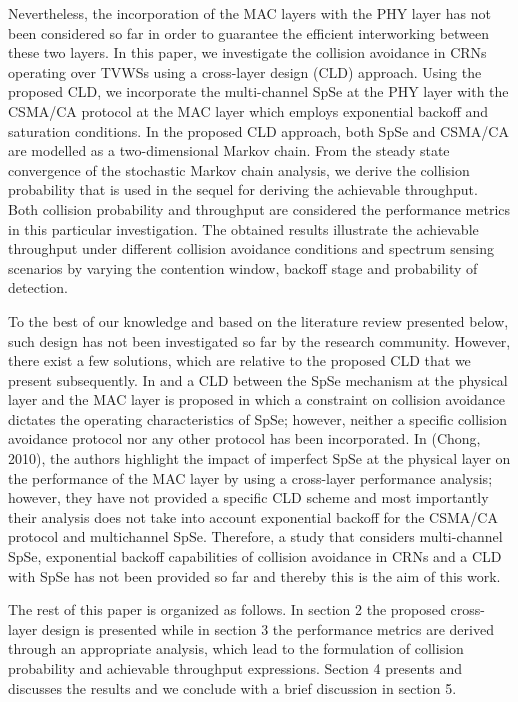 \documentclass
[journal,11pt,draftclsnofoot,onecolumn,doublespace]{tETN2e}
\begin{document}
Nevertheless, the incorporation of the MAC layers with the PHY layer has not been considered so far in order to guarantee the efficient interworking between these two layers. In this paper, we investigate the collision avoidance in CRNs operating over TVWSs using a cross-layer design (CLD) approach. Using the proposed CLD, we incorporate the multi-channel SpSe at the PHY layer with the CSMA/CA protocol at the MAC layer which employs exponential backoff and saturation conditions. In the proposed CLD approach, both SpSe and CSMA/CA are modelled as a two-dimensional Markov chain. From the steady state convergence of the stochastic Markov chain analysis, we derive the collision probability that is used in the sequel for deriving the achievable throughput. Both collision probability and throughput are considered the performance metrics in this particular investigation. The obtained results illustrate the achievable throughput under different collision avoidance conditions and spectrum sensing scenarios by varying the contention window, backoff stage and probability of detection.  

To the best of our knowledge and based on the literature review presented below, such design has not been investigated so far by the research community. However, there exist a few solutions, which are relative to the proposed CLD that we present subsequently. In \citep{chen08} and \citep{liang08} a CLD between the SpSe mechanism at the physical layer and the MAC layer is proposed in which a constraint on collision avoidance dictates the operating characteristics of SpSe; however, neither a specific collision avoidance protocol nor any other protocol has been incorporated. In (Chong, 2010), the authors highlight the impact of imperfect SpSe at the physical layer on the performance of the MAC layer by using a cross-layer performance analysis; however, they have not provided a specific CLD scheme and most importantly their analysis does not take into account exponential backoff for the CSMA/CA protocol and multichannel SpSe. Therefore, a study that considers multi-channel SpSe, exponential backoff capabilities of collision avoidance in CRNs and a CLD with SpSe has not been provided so far and thereby this is the aim of this work. 

The rest of this paper is organized as follows. In section 2 the proposed cross-layer design is presented while in section 3 the performance metrics are derived through an appropriate analysis, which lead to the formulation of collision probability and achievable throughput expressions. Section 4 presents and discusses the results and we conclude with a brief discussion in section 5.
\end{document}
